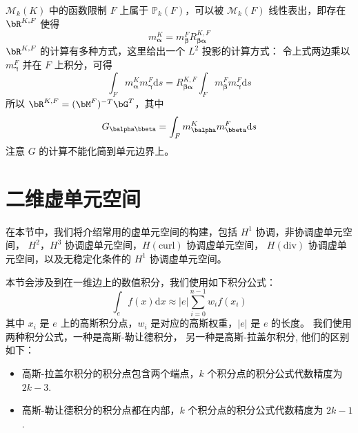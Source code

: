 $\mathcal{M}_k(K)$ 中的函数限制 $F$ 上属于 $\mathbb{P}_k(F)$，可以被 $\mathcal{M}_k(F)$
线性表出，即存在 $\bR^{K, F}$ 使得
$$
m_{\boldsymbol{\alpha}}^K = 
m^F_{\boldsymbol{\beta}}R^{K, F}_{\boldsymbol{\beta\alpha}}
$$
$\bR^{K, F}$ 的计算有多种方式，这里给出一个 $L^2$ 投影的计算方式：
令上式两边乘以 $m^F_{\boldsymbol{\gamma}}$ 并在 $F$ 上积分，可得
$$
\int_F m_{\boldsymbol{\alpha}}^Km^F_{\boldsymbol{\gamma}}\mathrm{d}s =
R^{K, F}_{\boldsymbol{\beta\alpha}}
\int_F m^F_{\boldsymbol{\beta}}m^F_{\boldsymbol{\gamma}}\mathrm{d}s
$$
所以 $\bR^{K, F} = (\bM^F)^{-T}\bG^T$，其中
$$
G_{\balpha\bbeta} = \int_F m^K_{\balpha}m^F_{\bbeta}\mathrm{d}s
$$
注意 $G$ 的计算不能化简到单元边界上。

 
\section{二维虚单元空间}
在本节中，我们将介绍常用的虚单元空间的构建，包括 $H^1$ 协调，非协调虚单元空间，
$H^2$，$H^3$ 协调虚单元空间，$H(\mathrm{curl})$ 协调虚单元空间，
$H(\mathrm{div})$ 协调虚单元空间，以及无稳定化条件的 $H^1$ 协调虚单元空间。

本节会涉及到在一维边上的数值积分，我们使用如下积分公式：
$$
\int_e f(x)\mathrm{d}x \approx |e|\sum_{i=0}^{n-1} w_i f(x_i)
$$
其中 $x_i$ 是 $e$ 上的高斯积分点，$w_i$ 是对应的高斯权重，$|e|$ 是 $e$ 的长度。
我们使用两种积分公式，一种是高斯-勒让德积分，
另一种是高斯-拉盖尔积分, 他们的区别如下：
\begin{itemize}
    \item 高斯-拉盖尔积分的积分点包含两个端点，$k$ 个积分点的积分公式代数精度为
        $2k-3$.
    \item 高斯-勒让德积分的积分点都在内部，$k$ 个积分点的积分公式代数精度为
        $2k-1$.
\end{itemize}

